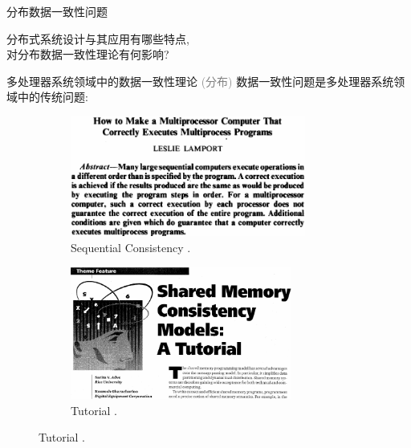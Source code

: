 \begin{frame}{分布数据一致性问题}

  \pause
  \vspace{0.80cm}

  \begin{center}
	分布式系统设计与其应用有哪些特点,\\对分布数据一致性理论有何影响?
  \end{center}

\end{frame}
\begin{frame}{多处理器系统领域中的数据一致性理论}
  \textcolor{gray}{\small (分布)} 数据一致性问题是多处理器系统领域中的传统问题:
  \vspace{0.50cm}

  \begin{figure}
	\begin{subfigure}{0.50\textwidth}
	  \centering
	  \includegraphics[width = 0.85\textwidth]{figures/lamport-paper79.png}
	  \caption{Sequential Consistency .}
	\end{subfigure}%
	\begin{subfigure}{0.45\textwidth}
	  \centering
	  \includegraphics[width = 0.80\textwidth]{figures/ieee-computer-tutorial.png}
	  \caption{Tutorial .}
	\end{subfigure}
  \end{figure}
\end{frame}
